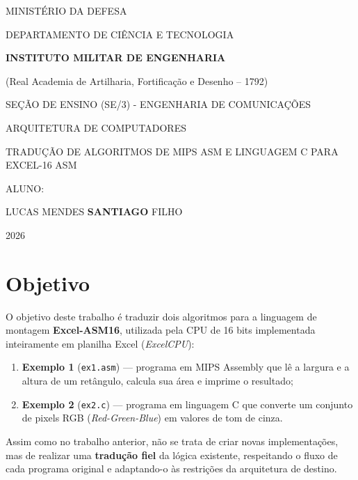 \documentclass[12pt, a4paper]{article}
\newcommand{\instituicaoA}{MINISTÉRIO DA DEFESA}
\newcommand{\instituicaoB}{DEPARTAMENTO DE CIÊNCIA E TECNOLOGIA}
\newcommand{\instituicaoC}{INSTITUTO MILITAR DE ENGENHARIA}
\newcommand{\instituicaoD}{(Real Academia de Artilharia, Fortificação e Desenho -- 1792)}
\newcommand{\secaoEnsino}{SEÇÃO DE ENSINO (SE/3) - ENGENHARIA DE COMUNICAÇÕES}
\newcommand{\disciplina}{ARQUITETURA DE COMPUTADORES}
\newcommand{\tituloTrabalho}{TRADUÇÃO DE ALGORITMOS DE MIPS ASM E LINGUAGEM C PARA EXCEL-16 ASM}
\newcommand{\alunoRotulo}{ALUNO:}
\newcommand{\alunoNome}{LUCAS MENDES \textbf{SANTIAGO} FILHO} %
\begin{document}
\thispagestyle{empty}
\begin{center}
  {\Large \instituicaoA\par}
  {\large \instituicaoB\par}
  {\large \bfseries \instituicaoC\par}
  {\small \instituicaoD\par}
  \vspace{1.5cm}
  {\large \secaoEnsino\par}
  {\large \disciplina\par}
  \vspace{3.2cm}
  {\large \tituloTrabalho\par}
  \vspace{6.0cm}
  {\large \alunoRotulo\par}
  \vspace{0.2cm}
  {\Large \alunoNome\par}
  \vfill
  {\small 2026\par}
\end{center}
\newpage

\tableofcontents
\newpage

\section{Objetivo}

O objetivo deste trabalho é traduzir dois algoritmos para a linguagem de montagem \textbf{Excel-ASM16}, utilizada pela CPU de 16 bits implementada inteiramente em planilha Excel (\emph{ExcelCPU}):

\begin{enumerate}[itemsep=4pt]
  \item \textbf{Exemplo 1} (\texttt{ex1.asm}) --- programa em MIPS Assembly que lê a largura e a altura de um retângulo, calcula sua área e imprime o resultado;
  \item \textbf{Exemplo 2} (\texttt{ex2.c}) --- programa em linguagem C que converte um conjunto de pixels RGB (\emph{Red-Green-Blue}) em valores de tom de cinza.
\end{enumerate}

Assim como no trabalho anterior, não se trata de criar novas implementações, mas de realizar uma \textbf{tradução fiel} da lógica existente, respeitando o fluxo de cada programa original e adaptando-o às restrições da arquitetura de destino.
\end{document}
